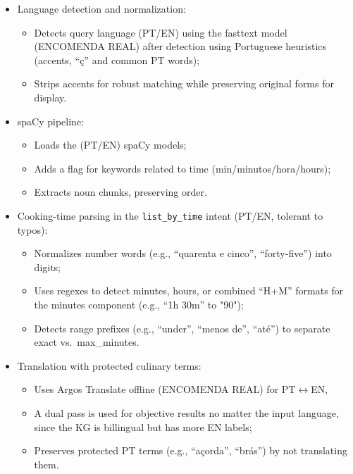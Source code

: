 \documentclass[conference]{IEEEtran}
\begin{document}
\begin{itemize}

  \item Language detection and normalization:
    \begin{itemize}
      \item Detects query language (PT/EN) using the fasttext model (ENCOMENDA REAL) after detection using Portuguese heuristics (accents, “ç” and common PT words);
      \item Strips accents for robust matching while preserving original forms for display.
    \end{itemize}

  \item spaCy pipeline:
    \begin{itemize}
      \item Loads the (PT/EN) spaCy models;
      \item Adds a flag for keywords related to time (min/minutos/hora/hours);
      \item Extracts noun chunks, preserving order.
    \end{itemize}

  \item Cooking-time parsing in the \texttt{list\_by\_time} intent (PT/EN, tolerant to typos):
    \begin{itemize}
      \item Normalizes number words (e.g., ``quarenta e cinco'', ``forty-five'') into digits;
      \item Uses regexes to detect minutes, hours, or combined ``H+M'' formats for the minutes component (e.g., ``1h 30m'' to "90");
      \item Detects range prefixes (e.g., ``under'', ``menos de'', ``até'') to separate exact vs.\ max\_minutes.
    \end{itemize}
  \item Translation with protected culinary terms:
    \begin{itemize}
      \item Uses Argos Translate offline (ENCOMENDA REAL) for PT$\leftrightarrow$EN, 
      \item A dual pass is used for objective results no matter the input language, since the KG is billingual but has more EN labels;     
      \item Preserves protected PT terms (e.g., ``açorda'', ``brás'') by not translating them.
    \end{itemize}


\end{itemize}
\end{document}
